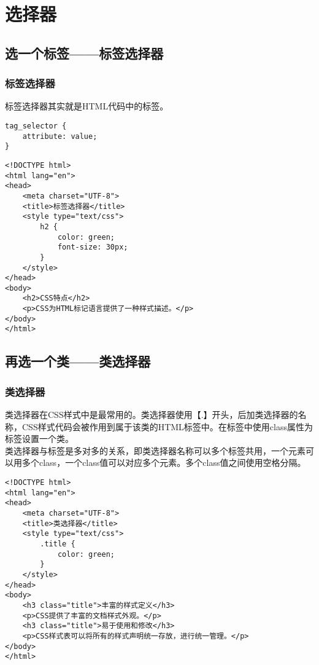 \chapter{选择器}

\section{选一个标签——标签选择器}

\subsection{标签选择器}

标签选择器其实就是HTML代码中的标签。 \\

\begin{lstlisting}[style=htmlcssjs]
tag_selector {
    attribute: value;
}
\end{lstlisting}

\begin{lstlisting}[style=htmlcssjs, title=标签选择器]
<!DOCTYPE html>
<html lang="en">
<head>
    <meta charset="UTF-8">
    <title>标签选择器</title>
    <style type="text/css">
        h2 {
            color: green;
            font-size: 30px;
        }
    </style>
</head>
<body>
    <h2>CSS特点</h2>
    <p>CSS为HTML标记语言提供了一种样式描述。</p>
</body>
</html>
\end{lstlisting}

\newpage

\section{再选一个类——类选择器}

\subsection{类选择器}

类选择器在CSS样式中是最常用的。类选择器使用【.】开头，后加类选择器的名称，CSS样式代码会被作用到属于该类的HTML标签中。在标签中使用class属性为标签设置一个类。 \\

类选择器与标签是多对多的关系，即类选择器名称可以多个标签共用，一个元素可以用多个class，一个class值可以对应多个元素。多个class值之间使用空格分隔。

\begin{lstlisting}[style=htmlcssjs, title=类选择器]
<!DOCTYPE html>
<html lang="en">
<head>
    <meta charset="UTF-8">
    <title>类选择器</title>
    <style type="text/css">
        .title {
            color: green;
        }
    </style>
</head>
<body>
    <h3 class="title">丰富的样式定义</h3>
    <p>CSS提供了丰富的文档样式外观。</p>
    <h3 class="title">易于使用和修改</h3>
    <p>CSS样式表可以将所有的样式声明统一存放，进行统一管理。</p>
</body>
</html>
\end{lstlisting}

